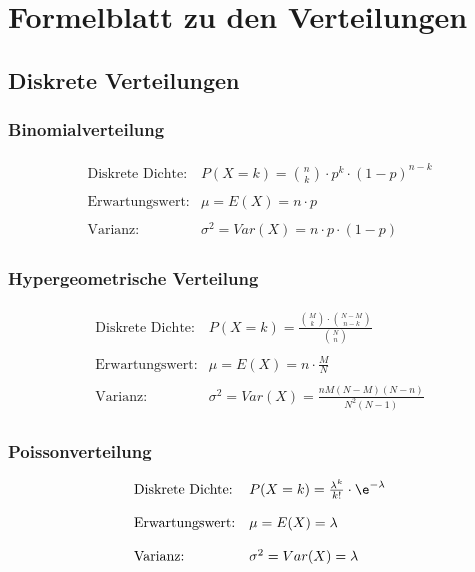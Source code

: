 \clearpage

\section{Formelblatt zu den Verteilungen}

\subsection{Diskrete Verteilungen}

\subsubsection{Binomialverteilung}
\begin{align*}
\begin{array}{ll}
\mbox{Diskrete Dichte:} & P(X=k) = {n \choose k} \cdot p^k \cdot (1-p)^{n-k} \\
{} & {} \\
\mbox{Erwartungswert:} & \mu = E(X) = n \cdot p \\
{} & {} \\
\mbox{Varianz:} & \sigma^2 = Var(X) = n \cdot p \cdot (1-p)
\end{array}
\end{align*}

\subsubsection{Hypergeometrische Verteilung}
\begin{align*}
\begin{array}{ll}
\mbox{Diskrete Dichte:} & P(X=k) = \frac{{M \choose k} \cdot {N-M \choose n-k}}{{N \choose n}} \\
{} & {} \\
\mbox{Erwartungswert:} & \mu = E(X) = n \cdot \frac{M}{N} \\
{} & {} \\
\mbox{Varianz:} & \sigma^2 = Var(X) = \frac{nM(N-M)(N-n)}{N^2(N-1)}
\end{array}
\end{align*}

\subsubsection{Poissonverteilung}
\begin{align*}
\begin{array}{ll}
\mbox{Diskrete Dichte:} & P(X=k) = \frac{\lambda^k}{k !} \cdot \e^{-\lambda}\\
{} & {} \\
\mbox{Erwartungswert:} & \mu = E(X) = \lambda \\
{} & {} \\
\mbox{Varianz:} & \sigma^2 = Var(X) =  \lambda
\end{array}
\end{align*}

